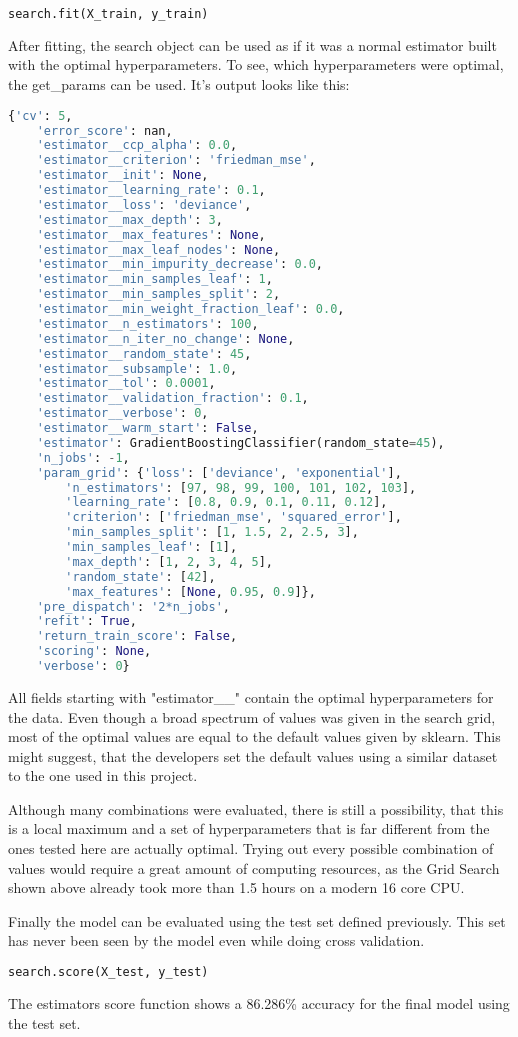 \begin{lstlisting}[language=Python]
    search.fit(X_train, y_train)
\end{lstlisting}

After fitting, the search object can be used as if it was a normal estimator built with the optimal 
hyperparameters.
To see, which hyperparameters were optimal, the get\_params can be used.
It's output looks like this:

\begin{lstlisting}[language=Python]
    {'cv': 5,
    'error_score': nan,
    'estimator__ccp_alpha': 0.0,
    'estimator__criterion': 'friedman_mse',
    'estimator__init': None,
    'estimator__learning_rate': 0.1,
    'estimator__loss': 'deviance',
    'estimator__max_depth': 3,
    'estimator__max_features': None,
    'estimator__max_leaf_nodes': None,
    'estimator__min_impurity_decrease': 0.0,
    'estimator__min_samples_leaf': 1,
    'estimator__min_samples_split': 2,
    'estimator__min_weight_fraction_leaf': 0.0,
    'estimator__n_estimators': 100,
    'estimator__n_iter_no_change': None,
    'estimator__random_state': 45,
    'estimator__subsample': 1.0,
    'estimator__tol': 0.0001,
    'estimator__validation_fraction': 0.1,
    'estimator__verbose': 0,
    'estimator__warm_start': False,
    'estimator': GradientBoostingClassifier(random_state=45),
    'n_jobs': -1,
    'param_grid': {'loss': ['deviance', 'exponential'],
        'n_estimators': [97, 98, 99, 100, 101, 102, 103],
        'learning_rate': [0.8, 0.9, 0.1, 0.11, 0.12],
        'criterion': ['friedman_mse', 'squared_error'],
        'min_samples_split': [1, 1.5, 2, 2.5, 3],
        'min_samples_leaf': [1],
        'max_depth': [1, 2, 3, 4, 5],
        'random_state': [42],
        'max_features': [None, 0.95, 0.9]},
    'pre_dispatch': '2*n_jobs',
    'refit': True,
    'return_train_score': False,
    'scoring': None,
    'verbose': 0}
\end{lstlisting}

All fields starting with "estimator\_\_" contain the optimal hyperparameters for the data.
Even though a broad spectrum of values was given in the search grid, most of the optimal values 
are equal to the default values given by sklearn. This might suggest, that the developers
set the default values using a similar dataset to the one used in this project.

Although many combinations were evaluated, there is still a possibility, that this is a local 
maximum and a set of hyperparameters that is far different from the ones tested here are actually
optimal. Trying out every possible combination of values would require a great amount of 
computing resources, as the Grid Search shown above already took more than 1.5 hours on a 
modern 16 core CPU.

Finally the model can be evaluated using the test set defined previously. This set has never been 
seen by the model even while doing cross validation.

\begin{lstlisting}[language=Python]
    search.score(X_test, y_test)
\end{lstlisting}

The estimators score function shows a 86.286\% accuracy for the final model using the test set.